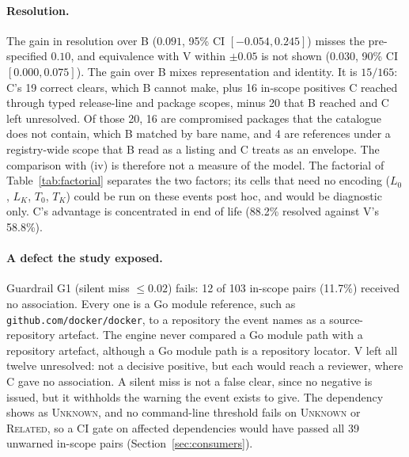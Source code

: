 \documentclass[11pt,a4paper]{article}
\newcommand{\code}[1]{\texttt{#1}}
\begin{document}
\paragraph{Resolution.} The gain
in resolution over B ($0.091$, 95\% CI $[-0.054, 0.245]$) misses the
pre-specified $0.10$, and equivalence with V within $\pm 0.05$ is not
shown ($0.030$, 90\% CI $[0.000, 0.075]$). The gain over B mixes
representation and identity. It is $15/165$: C's 19 correct clears,
which B cannot make, plus 16 in-scope positives C reached through
typed release-line and package scopes, minus 20 that B reached and C
left unresolved. Of those 20, 16 are compromised packages that the
catalogue does not contain, which B matched by bare name, and 4 are
references under a registry-wide scope that B read as a listing and C
treats as an envelope. The comparison with (iv) is therefore not a
measure of the model. The factorial of Table~\ref{tab:factorial}
separates the two factors; its cells that need no encoding ($L_0$,
$L_K$, $T_0$, $T_K$) could be run on these events post hoc, and would
be diagnostic only. C's advantage is
concentrated in end of life (88.2\% resolved against V's 58.8\%).

\paragraph{A defect the study exposed.} Guardrail G1 (silent miss
$\le 0.02$) fails: 12 of 103 in-scope pairs (11.7\%) received no
association. Every one is a Go module reference, such as
\code{github.com/docker/docker}, to a repository the event names as a
source-repository artefact. The engine never compared a Go module path
with a repository artefact, although a Go module path is a repository
locator. V left all twelve unresolved: not a decisive positive, but
each would reach a reviewer, where C gave no association. A silent
miss is not a false clear, since no negative is issued, but it
withholds the warning the event exists to give. The dependency shows
as \textsc{Unknown}, and no command-line threshold fails on
\textsc{Unknown} or \textsc{Related}, so a CI gate on affected
dependencies would have passed all 39 unwarned in-scope pairs
(Section~\ref{sec:consumers}).
\end{document}
